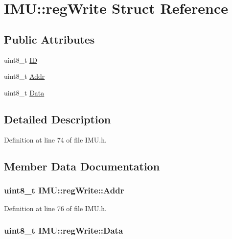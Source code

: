 \hypertarget{struct_i_m_u_1_1reg_write}{
\section{IMU::regWrite Struct Reference}
\label{struct_i_m_u_1_1reg_write}
}
\subsection*{Public Attributes}
\begin{DoxyCompactItemize}
\item 
uint8\_\-t \hyperlink{struct_i_m_u_1_1reg_write_aca32b881a20ec7adc84956176aa65a7b}{ID}
\item 
uint8\_\-t \hyperlink{struct_i_m_u_1_1reg_write_a814db0ab3fab7c9d45784c8f0eba74c5}{Addr}
\item 
uint8\_\-t \hyperlink{struct_i_m_u_1_1reg_write_ace45ec9e1c4549b73f81a62d409da7d9}{Data}
\end{DoxyCompactItemize}


\subsection{Detailed Description}


Definition at line 74 of file IMU.h.



\subsection{Member Data Documentation}
\hypertarget{struct_i_m_u_1_1reg_write_a814db0ab3fab7c9d45784c8f0eba74c5}{
\subsubsection[{Addr}]{\setlength{\rightskip}{0pt plus 5cm}uint8\_\-t {\bf IMU::regWrite::Addr}}}
\label{struct_i_m_u_1_1reg_write_a814db0ab3fab7c9d45784c8f0eba74c5}


Definition at line 76 of file IMU.h.

\hypertarget{struct_i_m_u_1_1reg_write_ace45ec9e1c4549b73f81a62d409da7d9}{
\subsubsection[{Data}]{\setlength{\rightskip}{0pt plus 5cm}uint8\_\-t {\bf IMU::regWrite::Data}}}
\label{struct_i_m_u_1_1reg_write_ace45ec9e1c4549b73f81a62d409da7d9}


